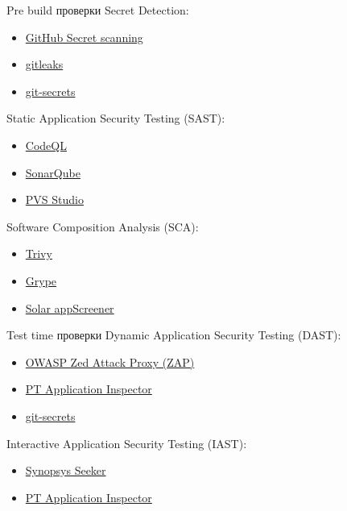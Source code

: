 \documentclass[aspectratio=169]{beamer}
\begin{document}
    \begin{frame}{Pre build проверки}
        Secret Detection:
        \vspace{-0.5em}
        \begin{itemize}
            \item \href{https://docs.github.com/en/code-security/secret-scanning/introduction/about-secret-scanning}{GitHub Secret scanning}
            \item \href{https://github.com/zricethezav/gitleaks}{gitleaks}
            \item \href{https://github.com/awslabs/git-secrets}{git-secrets}
        \end{itemize}

        Static Application Security Testing (SAST):
        \vspace{-0.5em}
        \begin{itemize}
            \item \href{https://codeql.github.com/}{CodeQL}
            \item \href{https://www.sonarsource.com/products/sonarqube/server/}{SonarQube}
            \item \href{https://pvs-studio.com/en/pvs-studio/sast/}{PVS Studio}
        \end{itemize}

        Software Composition Analysis (SCA):
        \vspace{-0.5em}
        \begin{itemize}
            \item \href{https://trivy.dev/}{Trivy}
            \item \href{https://github.com/anchore/grype}{Grype}
            \item \href{https://rt-solar.ru/products/solar_appscreener/}{Solar appScreener}
        \end{itemize}
    \end{frame}

    \begin{frame}{Test time проверки}
        Dynamic Application Security Testing (DAST):
        \begin{itemize}
            \item \href{https://www.zaproxy.org/}{OWASP Zed Attack Proxy (ZAP)}
            \item \href{https://global.ptsecurity.com/en/products/ai/}{PT Application Inspector}
            \item \href{https://github.com/awslabs/git-secrets}{git-secrets}
        \end{itemize}

        Interactive Application Security Testing (IAST):
        \begin{itemize}
            \item \href{https://codeql.github.com/}{Synopsys Seeker}
            \item \href{https://global.ptsecurity.com/en/products/ai/}{PT Application Inspector}
        \end{itemize}
    \end{frame}
\end{document}
